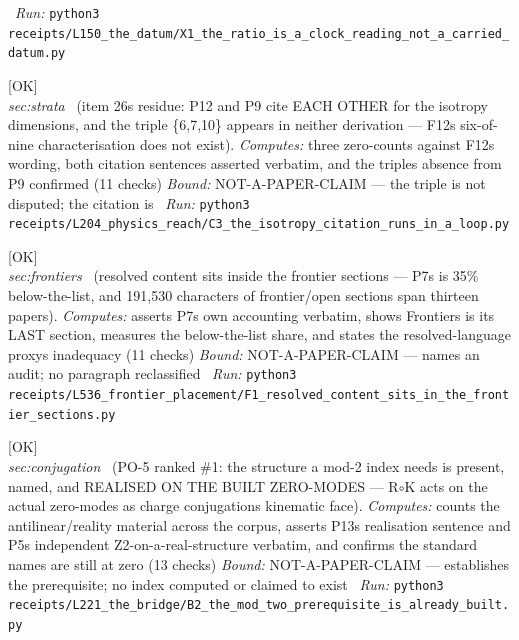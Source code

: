 \begin{description}
\ \emph{Run:} \texttt{python3 receipts/L150\_the\_datum/X1\_the\_ratio\_is\_a\_clock\_reading\_not\_a\_carried\_datum.py}
\item[\label{rcpt:C3_the_isotropy_citation_runs_in_a_loop}\texttt{C3\_the\_isotropy\_citation\_runs\_in\_a\_loop}]\hfill\textsf{[OK]}\\
\textit{sec:strata} \ (item 26s residue: P12 and P9 cite EACH OTHER for the isotropy dimensions, and the triple \{6,7,10\} appears in neither derivation --- F12s six-of-nine characterisation does not exist). 
\emph{Computes:} three zero-counts against F12s wording, both citation sentences asserted verbatim, and the triples absence from P9 confirmed (11 checks)
 \emph{Bound:} NOT-A-PAPER-CLAIM --- the triple is not disputed; the citation is
\ \emph{Run:} \texttt{python3 receipts/L204\_physics\_reach/C3\_the\_isotropy\_citation\_runs\_in\_a\_loop.py}
\item[\label{rcpt:F1_resolved_content_sits_in_the_frontier_sections}\texttt{F1\_resolved\_content\_sits\_in\_the\_frontier\_sections}]\hfill\textsf{[OK]}\\
\textit{sec:frontiers} \ (resolved content sits inside the frontier sections --- P7s is 35\% below-the-list, and 191,530 characters of frontier/open sections span thirteen papers). 
\emph{Computes:} asserts P7s own accounting verbatim, shows Frontiers is its LAST section, measures the below-the-list share, and states the resolved-language proxys inadequacy (11 checks)
 \emph{Bound:} NOT-A-PAPER-CLAIM --- names an audit; no paragraph reclassified
\ \emph{Run:} \texttt{python3 receipts/L536\_frontier\_placement/F1\_resolved\_content\_sits\_in\_the\_frontier\_sections.py}
\item[\label{rcpt:B2_the_mod_two_prerequisite_is_already_built}\texttt{B2\_the\_mod\_two\_prerequisite\_is\_already\_built}]\hfill\textsf{[OK]}\\
\textit{sec:conjugation} \ (PO-5 ranked \#1: the structure a mod-2 index needs is present, named, and REALISED ON THE BUILT ZERO-MODES --- R\ensuremath{\circ}K acts on the actual zero-modes as charge conjugations kinematic face). 
\emph{Computes:} counts the antilinear/reality material across the corpus, asserts P13s realisation sentence and P5s independent Z2-on-a-real-structure verbatim, and confirms the standard names are still at zero (13 checks)
 \emph{Bound:} NOT-A-PAPER-CLAIM --- establishes the prerequisite; no index computed or claimed to exist
\ \emph{Run:} \texttt{python3 receipts/L221\_the\_bridge/B2\_the\_mod\_two\_prerequisite\_is\_already\_built.py}

\end{description}
